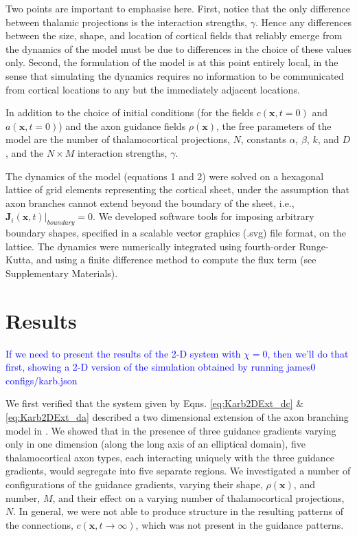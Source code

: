 \documentclass[a4paper,11pt]{article}
\newcommand{\cmnt}[1]{\textcolor{blue}{#1}}
\newcommand{\code}[1]{\textsf{#1}}
\newcommand{\mb}[1]{\mathbf{#1}}
\begin{document}
Two points are important to emphasise here. First, notice that the only
difference between thalamic projections is the interaction strengths,
$\gamma$. Hence any differences between the size, shape, and location of
cortical fields that reliably emerge from the dynamics of the model must be
due to differences in the choice of these values only. Second, the formulation
of the model is at this point entirely local, in the sense that simulating the
dynamics requires no information to be communicated from cortical locations to
any but the immediately adjacent locations.

In addition to the choice of initial conditions (for the fields
$c(\mb{x},t=0)$ and $a(\mb{x},t=0)$) and the axon guidance fields
$\rho(\mb{x})$, the free parameters of the model are the number of
thalamocortical projections, $N$, constants $\alpha$, $\beta$, $k$, and $D$,
and the $N\times M$ interaction strengths, $\gamma$.

The dynamics of the model (equations 1 and 2) were solved on a hexagonal
lattice of grid elements representing the cortical sheet, under the assumption
that axon branches cannot extend beyond the boundary of the sheet, i.e.,
$\mb{J}_i(\mb{x},t) \bigg\rvert_{boundary} = 0$. We developed software tools
for imposing arbitrary boundary shapes, specified in a scalable vector
graphics (.svg) file format, on the lattice. The dynamics were numerically
integrated using fourth-order Runge-Kutta, and using a {\color{red} finite
  difference method} to compute the flux term (see Supplementary Materials).

\section*{Results}

\cmnt{If we need to present the results of the 2-D system with $\chi=0$, then
  we'll do that first, showing a 2-D version of the simulation obtained by
  running \code{james0 configs/karb.json}}

We first verified that the system given by Eqns. \ref{eq:Karb2DExt_dc} \&
\ref{eq:Karb2DExt_da} described a two dimensional extension of the axon
branching model in \citet{Karbowski2004}. We showed that in the presence of
three guidance gradients varying only in one dimension (along the long axis of
an elliptical domain), five thalamocortical axon types, each interacting
uniquely with the three guidance gradients, would segregate into five separate
regions. We investigated a number of configurations of the guidance gradients,
varying their shape, $\rho(\mb{x})$, and number, $M$, and their effect on a
varying number of thalamocortical projections, $N$. In general, we were not
able to produce structure in the resulting patterns of the connections,
$c(\mb{x},t\rightarrow\infty)$, which was not present in the guidance
patterns.
\end{document}
